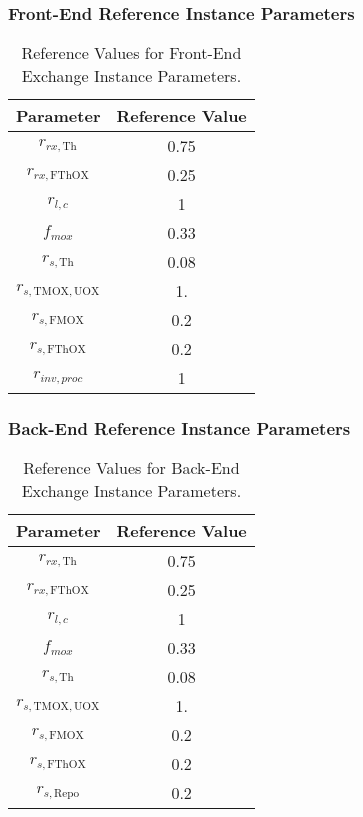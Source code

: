 \subsubsection{Front-End Reference Instance Parameters}

\begin{table}[h!]
\centering
\caption{Reference Values for Front-End Exchange Instance Parameters.}
\label{tbl:front_ref_params}
\begin{tabular}{|c|c|}
\hline
Parameter    & Reference Value
\\ \hline
$r_{rx, \text{Th}}$   & 0.75 
\\ \hline
$r_{rx, \text{FThOX}}$ & 0.25
\\ \hline
$r_{l, c}$ & 1
\\ \hline
$f_{mox}$     & 0.33
\\ \hline
$r_{s, \text{Th}}$ & 0.08
\\ \hline
$r_{s, \text{TMOX}, \text{UOX}}$ & 1.
\\ \hline
$r_{s, \text{FMOX}}$ & 0.2
\\ \hline
$r_{s, \text{FThOX}}$ & 0.2
\\ \hline
$r_{inv, proc}$   & 1
\\ \hline
\end{tabular}
\end{table}


\subsubsection{Back-End Reference Instance Parameters}

\begin{table}[h!]
\centering
\caption{Reference Values for Back-End Exchange Instance Parameters.}
\label{tbl:back_ref_params}
\begin{tabular}{|c|c|}
\hline
Parameter    & Reference Value
\\ \hline
$r_{rx, \text{Th}}$   & 0.75 
\\ \hline
$r_{rx, \text{FThOX}}$ & 0.25
\\ \hline
$r_{l, c}$ & 1
\\ \hline
$f_{mox}$     & 0.33
\\ \hline
$r_{s, \text{Th}}$ & 0.08
\\ \hline
$r_{s, \text{TMOX}, \text{UOX}}$ & 1.
\\ \hline
$r_{s, \text{FMOX}}$ & 0.2
\\ \hline
$r_{s, \text{FThOX}}$ & 0.2
\\ \hline
$r_{s, \text{Repo}}$   & 0.2
\\ \hline
\end{tabular}
\end{table}

